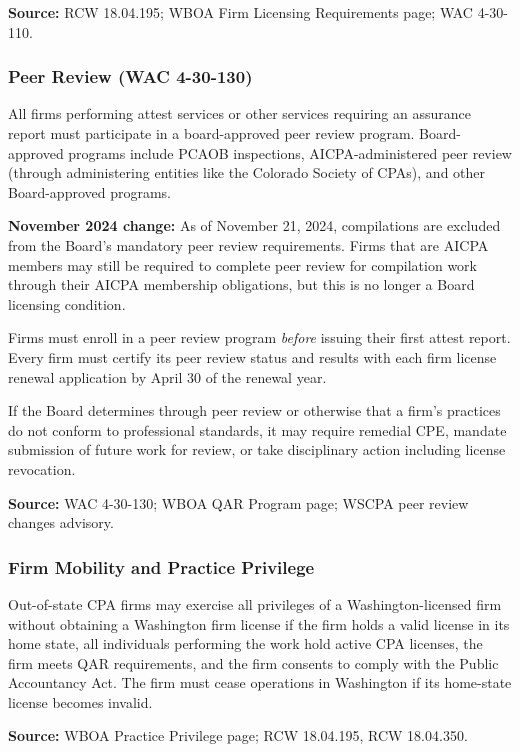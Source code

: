 \documentclass[11pt,letterpaper]{article}
\begin{document}
\textbf{Source:} RCW 18.04.195; WBOA Firm Licensing Requirements page; WAC 4-30-110.

\subsubsection{Peer Review (WAC 4-30-130)}

All firms performing attest services or other services requiring an assurance report must participate in a board-approved peer review program. Board-approved programs include PCAOB inspections, AICPA-administered peer review (through administering entities like the Colorado Society of CPAs), and other Board-approved programs.

\textbf{November 2024 change:} As of November 21, 2024, compilations are excluded from the Board's mandatory peer review requirements. Firms that are AICPA members may still be required to complete peer review for compilation work through their AICPA membership obligations, but this is no longer a Board licensing condition.

Firms must enroll in a peer review program \emph{before} issuing their first attest report. Every firm must certify its peer review status and results with each firm license renewal application by April 30 of the renewal year.

If the Board determines through peer review or otherwise that a firm's practices do not conform to professional standards, it may require remedial CPE, mandate submission of future work for review, or take disciplinary action including license revocation.

\textbf{Source:} WAC 4-30-130; WBOA QAR Program page; WSCPA peer review changes advisory.

\subsubsection{Firm Mobility and Practice Privilege}

Out-of-state CPA firms may exercise all privileges of a Washington-licensed firm without obtaining a Washington firm license if the firm holds a valid license in its home state, all individuals performing the work hold active CPA licenses, the firm meets QAR requirements, and the firm consents to comply with the Public Accountancy Act. The firm must cease operations in Washington if its home-state license becomes invalid.

\textbf{Source:} WBOA Practice Privilege page; RCW 18.04.195, RCW 18.04.350.
\end{document}
